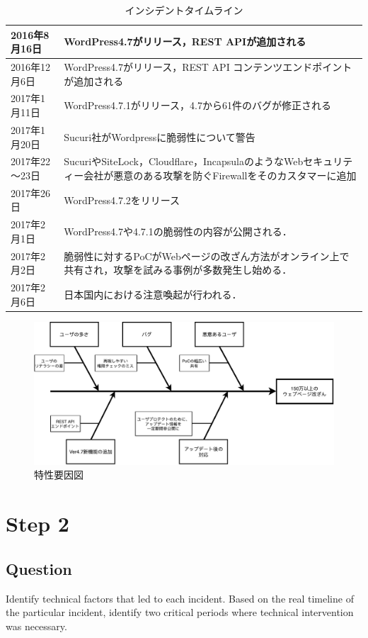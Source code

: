 \documentclass[uplatex]{jsarticle}
\begin{document}
\begin{table}[htbp]
    \centering
    \caption{インシデントタイムライン}
    \label{tab:incident_timeline}
    \begin{tabular}{|l|p{12cm}|}
    \hline
    2016年8月16日 & WordPress4.7がリリース，REST APIが追加される \\ \hline
    2016年12月6日 & WordPress4.7がリリース，REST API コンテンツエンドポイントが追加される \\ \hline
    2017年1月11日 & WordPress4.7.1がリリース，4.7から61件のバグが修正される \\ \hline
    2017年1月20日 & Sucuri社がWordpressに脆弱性について警告 \\ \hline
    2017年22～23日 & SucuriやSiteLock，Cloudflare，IncapsulaのようなWebセキュリティー会社が悪意のある攻撃を防ぐFirewallをそのカスタマーに追加 \\ \hline
    2017年26日 & WordPress4.7.2をリリース \\ \hline
    2017年2月1日 & WordPress4.7や4.7.1の脆弱性の内容が公開される． \\ \hline
    2017年2月2日 & 脆弱性に対するPoCがWebページの改ざん方法がオンライン上で共有され，攻撃を試みる事例が多数発生し始める． \\ \hline
    2017年2月6日 & 日本国内における注意喚起が行われる． \\ \hline
    \end{tabular}
\end{table}

\begin{figure}[htbp]
    \centering
    \includegraphics[width=0.8\linewidth]{pic/fishbone-GroupB.pdf}
    \caption{特性要因図}
    \label{fig:fishbone}
\end{figure}

\section*{Step 2}
\subsection*{Question}
Identify technical factors that led to each incident. Based on the real timeline of the particular incident, identify two critical periods where technical intervention was necessary.
\end{document}
